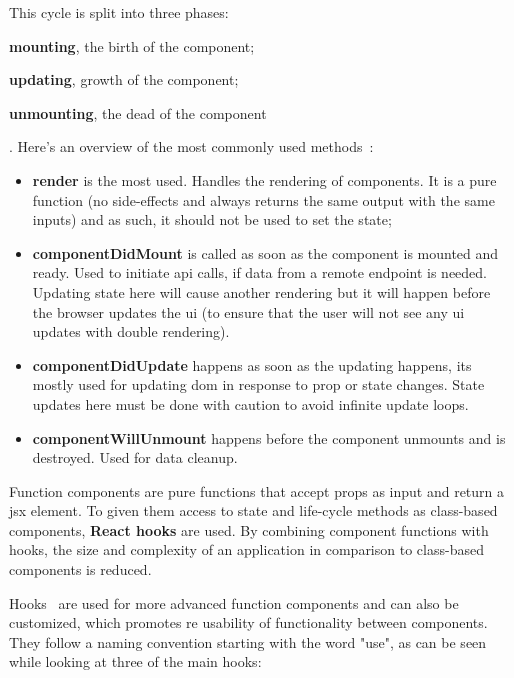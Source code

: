 This cycle is split into three phases: \begin{inparaenum}[1)] \item \textbf{mounting}, the birth of the component; \item \textbf{updating}, growth of the component; \item \textbf{unmounting}, the dead of the component \end{inparaenum}. Here's an overview of the most commonly used methods~\cite{react-lifecycle-functions}:

\begin{itemize}
    \item \textbf{render} is the most used. Handles the rendering of components. It is a pure function (no side-effects and always returns the same output with the same inputs) and as such, it should not be used to set the state;
    
    \item \textbf{componentDidMount} is called as soon as the component is mounted and ready. Used to initiate \acrshort{api} calls, if data from a remote endpoint is needed. Updating state here will cause another rendering but it will happen before the browser updates the \acrshort{ui} (to ensure that the user will not see any \acrshort{ui} updates with double rendering).
    
    \item \textbf{componentDidUpdate} happens as soon as the updating happens, its mostly used for updating \acrshort{dom} in response to prop or state changes. State updates here must be done with caution to avoid infinite update loops.
    
    \item \textbf{componentWillUnmount} happens before the component unmounts and is destroyed. Used for data cleanup.
\end{itemize}

Function components are pure functions that accept props as input and return a \acrshort{jsx} element. To given them access to state and life-cycle methods as class-based components, \textbf{React hooks} are used. By combining component functions with hooks, the size and complexity of an application in comparison to class-based components is reduced.

Hooks~\cite{react-hooks} are used for more advanced function components and can also be customized, which promotes re usability of functionality between components. They follow a naming convention starting with the word "use", as can be seen while looking at three of the main hooks:

